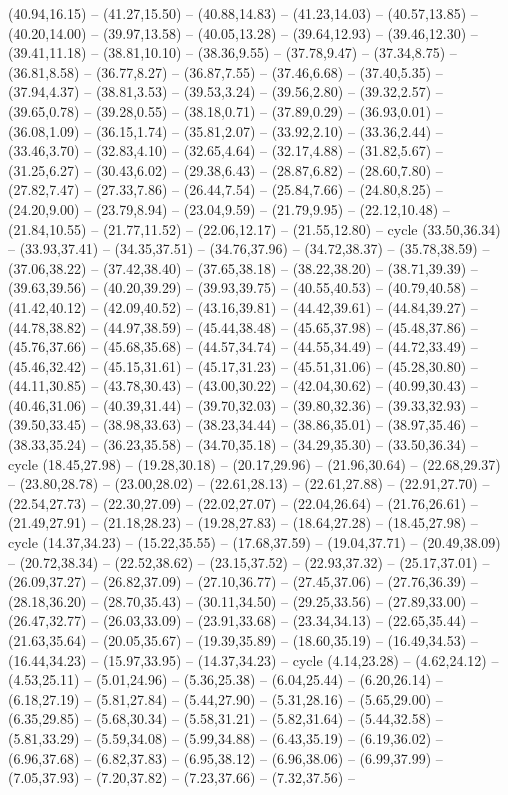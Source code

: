{(40.94,16.15) -- (41.27,15.50) -- (40.88,14.83) -- (41.23,14.03) -- (40.57,13.85) -- (40.20,14.00) -- (39.97,13.58) -- (40.05,13.28) -- (39.64,12.93) -- (39.46,12.30) -- (39.41,11.18) -- (38.81,10.10) -- (38.36,9.55) -- (37.78,9.47) -- (37.34,8.75) -- (36.81,8.58) -- (36.77,8.27) -- (36.87,7.55) -- (37.46,6.68) -- (37.40,5.35) -- (37.94,4.37) -- (38.81,3.53) -- (39.53,3.24) -- (39.56,2.80) -- (39.32,2.57) -- (39.65,0.78) -- (39.28,0.55) -- (38.18,0.71) -- (37.89,0.29) -- (36.93,0.01) -- (36.08,1.09) -- (36.15,1.74) -- (35.81,2.07) -- (33.92,2.10) -- (33.36,2.44) -- (33.46,3.70) -- (32.83,4.10) -- (32.65,4.64) -- (32.17,4.88) -- (31.82,5.67) -- (31.25,6.27) -- (30.43,6.02) -- (29.38,6.43) -- (28.87,6.82) -- (28.60,7.80) -- (27.82,7.47) -- (27.33,7.86) -- (26.44,7.54) -- (25.84,7.66) -- (24.80,8.25) -- (24.20,9.00) -- (23.79,8.94) -- (23.04,9.59) -- (21.79,9.95) -- (22.12,10.48) -- (21.84,10.55) -- (21.77,11.52) -- (22.06,12.17) -- (21.55,12.80) -- cycle (33.50,36.34) -- (33.93,37.41) -- (34.35,37.51) -- (34.76,37.96) -- (34.72,38.37) -- (35.78,38.59) -- (37.06,38.22) -- (37.42,38.40) -- (37.65,38.18) -- (38.22,38.20) -- (38.71,39.39) -- (39.63,39.56) -- (40.20,39.29) -- (39.93,39.75) -- (40.55,40.53) -- (40.79,40.58) -- (41.42,40.12) -- (42.09,40.52) -- (43.16,39.81) -- (44.42,39.61) -- (44.84,39.27) -- (44.78,38.82) -- (44.97,38.59) -- (45.44,38.48) -- (45.65,37.98) -- (45.48,37.86) -- (45.76,37.66) -- (45.68,35.68) -- (44.57,34.74) -- (44.55,34.49) -- (44.72,33.49) -- (45.46,32.42) -- (45.15,31.61) -- (45.17,31.23) -- (45.51,31.06) -- (45.28,30.80) -- (44.11,30.85) -- (43.78,30.43) -- (43.00,30.22) -- (42.04,30.62) -- (40.99,30.43) -- (40.46,31.06) -- (40.39,31.44) -- (39.70,32.03) -- (39.80,32.36) -- (39.33,32.93) -- (39.50,33.45) -- (38.98,33.63) -- (38.23,34.44) -- (38.86,35.01) -- (38.97,35.46) -- (38.33,35.24) -- (36.23,35.58) -- (34.70,35.18) -- (34.29,35.30) -- (33.50,36.34) -- cycle (18.45,27.98) -- (19.28,30.18) -- (20.17,29.96) -- (21.96,30.64) -- (22.68,29.37) -- (23.80,28.78) -- (23.00,28.02) -- (22.61,28.13) -- (22.61,27.88) -- (22.91,27.70) -- (22.54,27.73) -- (22.30,27.09) -- (22.02,27.07) -- (22.04,26.64) -- (21.76,26.61) -- (21.49,27.91) -- (21.18,28.23) -- (19.28,27.83) -- (18.64,27.28) -- (18.45,27.98) -- cycle (14.37,34.23) -- (15.22,35.55) -- (17.68,37.59) -- (19.04,37.71) -- (20.49,38.09) -- (20.72,38.34) -- (22.52,38.62) -- (23.15,37.52) -- (22.93,37.32) -- (25.17,37.01) -- (26.09,37.27) -- (26.82,37.09) -- (27.10,36.77) -- (27.45,37.06) -- (27.76,36.39) -- (28.18,36.20) -- (28.70,35.43) -- (30.11,34.50) -- (29.25,33.56) -- (27.89,33.00) -- (26.47,32.77) -- (26.03,33.09) -- (23.91,33.68) -- (23.34,34.13) -- (22.65,35.44) -- (21.63,35.64) -- (20.05,35.67) -- (19.39,35.89) -- (18.60,35.19) -- (16.49,34.53) -- (16.44,34.23) -- (15.97,33.95) -- (14.37,34.23) -- cycle (4.14,23.28) -- (4.62,24.12) -- (4.53,25.11) -- (5.01,24.96) -- (5.36,25.38) -- (6.04,25.44) -- (6.20,26.14) -- (6.18,27.19) -- (5.81,27.84) -- (5.44,27.90) -- (5.31,28.16) -- (5.65,29.00) -- (6.35,29.85) -- (5.68,30.34) -- (5.58,31.21) -- (5.82,31.64) -- (5.44,32.58) -- (5.81,33.29) -- (5.59,34.08) -- (5.99,34.88) -- (6.43,35.19) -- (6.19,36.02) -- (6.96,37.68) -- (6.82,37.83) -- (6.95,38.12) -- (6.96,38.06) -- (6.99,37.99) -- (7.05,37.93) -- (7.20,37.82) -- (7.23,37.66) -- (7.32,37.56) -- }
